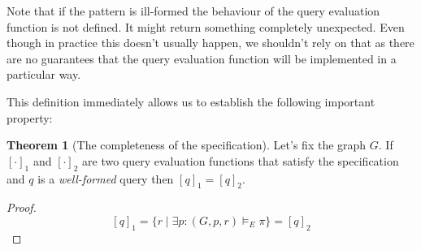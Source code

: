 \documentclass[14pt]{constructor-thesis}
\theoremstyle{definition}
\newtheorem{theorem}{Theorem}
\newtheorem{definition}{Definition}
\begin{document}



Note that if the pattern is ill-formed the behaviour of the query evaluation function is not defined. It might return something completely unexpected. Even though in practice this doesn't usually happen, we shouldn't rely on that as there are no guarantees that the query evaluation function will be implemented in a particular way.

This definition immediately allows us to establish the following important property:
\begin{theorem}[The completeness of the specification]
  Let's fix the graph $G$.
  If $[\cdot]_1$ and $[\cdot]_2$ are two query evaluation functions that satisfy the specification and $q$ is a \textit{well-formed} query then $[q]_1 = [q]_2$.
\end{theorem}
\begin{proof}
  $$[q]_1 = \{ r \mid \exists p : (G, p, r) \models_E \pi \} = [q]_2$$
\end{proof}
\end{document}
